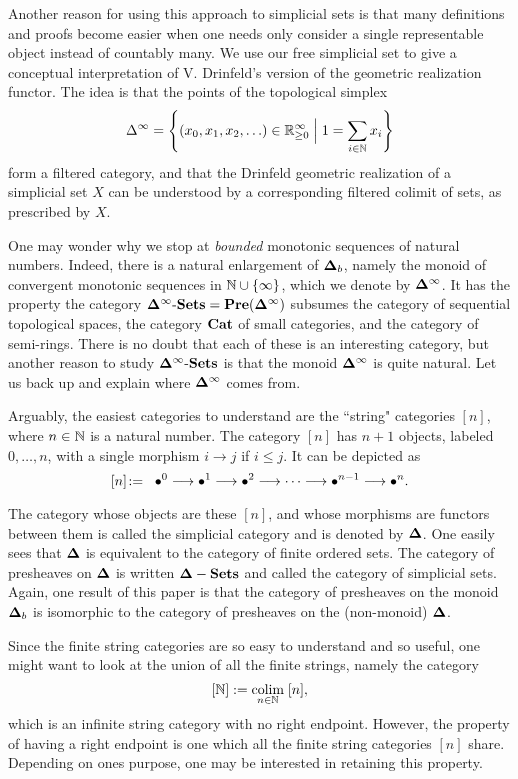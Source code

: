 \documentclass{amsart}
\def\Del{{\bf \Delta}}
\def\dashSets{{\tn{-}\Sets}}
\def\Delinf{{\Del^\infty}}
\def\Delb{{\Del_b}}
\def\DSets{{\Delinf\dashSets}}
\begin{document}
Another reason for using this approach to simplicial sets is that many definitions and proofs become easier when one needs only consider a single representable object instead of countably many.  We use our free simplicial set to give a conceptual interpretation of V. Drinfeld's version \cite{} of the geometric realization functor.  The idea is that the points of the topological simplex $$\Delta^\infty=\left\{(x_0,x_1,x_2,\ldots)\in{\mathbb R}^\infty_{\geq 0}\;\Big|\; 1=\sum_{i\in{\mathbb N}} x_i\right\}$$ form a filtered category, and that the Drinfeld geometric realization of a simplicial set $X$ can be understood by a corresponding filtered colimit of sets, as prescribed by $X$.

One may wonder why we stop at {\em bounded} monotonic sequences of natural numbers.  Indeed, there is a natural enlargement of $\Delb$, namely the monoid of convergent monotonic sequences in ${\mathbb N}\cup\{\infty\}$, which we denote by $\Delinf$.  It has the property the category $\DSets=\Pre(\Delinf)$ subsumes the category of sequential topological spaces, the category ${\bf Cat}$ of small categories, and the category of semi-rings.  There is no doubt that each of these is an interesting category, but another reason to study $\DSets$ is that the monoid $\Delinf$ is quite natural.  Let us back up and explain where $\Delinf$ comes from.

Arguably, the easiest categories to understand are the ``string" categories $[n]$, where $n\in{\mathbb N}$ is a natural number.  The category $[n]$ has $n+1$ objects, labeled $0,\ldots,n$, with a single morphism $i\to j$ if $i\leq j$.  It can be depicted as $$[n]\!:=\;\;\bullet^0\longrightarrow\bullet^1\longrightarrow\bullet^2\longrightarrow\cdots\longrightarrow\bullet^{n-1}\longrightarrow\bullet^n.$$  

The category whose objects are these $[n]$, and whose morphisms are functors between them is called the simplicial category and is denoted by $\Del$.  One easily sees that $\Del$ is equivalent to the category of finite ordered sets.  The category of presheaves on $\Del$ is written $\Del-\Sets$ and called the category of simplicial sets.  Again, one result of this paper is that the category of presheaves on the monoid $\Delb$ is isomorphic to the category of presheaves on the (non-monoid) $\Del$.

Since the finite string categories are so easy to understand and so useful, one might want to look at the union of all the finite strings, namely the category $$[{\mathbb N}]:=\mathop{\textnormal{colim}}_{n\in{\mathbb N}}\; [n],$$ which is an infinite string category with no right endpoint.  However, the property of having a right endpoint is one which all the finite string categories $[n]$ share.  Depending on ones purpose, one may be interested in retaining this property.  
\end{document}
